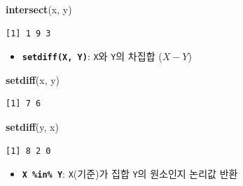 \documentclass[
  11pt,
]{krantz}
\newenvironment{Shaded}{\begin{snugshade}}{\end{snugshade}}
\newcommand{\KeywordTok}[1]{\textcolor[rgb]{0.27,0.27,0.27}{\textbf{#1}}}
\newcommand{\NormalTok}[1]{#1}
\newcommand{\OperatorTok}[1]{\textcolor[rgb]{0.43,0.43,0.43}{\textbf{#1}}}
\newcommand{\StringTok}[1]{\textcolor[rgb]{0.5,0.5,0.5}{#1}}
\providecommand{\tightlist}{%
  \setlength{\itemsep}{0pt}\setlength{\parskip}{0pt}}
\begin{document}
\footnotesize

\begin{Shaded}
\begin{Highlighting}[]
\KeywordTok{intersect}\NormalTok{(x, y)}
\end{Highlighting}
\end{Shaded}

\begin{verbatim}
[1] 1 9 3
\end{verbatim}

\normalsize

\begin{itemize}
\tightlist
\item
  \textbf{\texttt{setdiff(X,\ Y)}}: \texttt{X}와 \texttt{Y}의 차집합 (\(X - Y\))
\end{itemize}

\footnotesize

\begin{Shaded}
\begin{Highlighting}[]
\KeywordTok{setdiff}\NormalTok{(x, y)}
\end{Highlighting}
\end{Shaded}

\begin{verbatim}
[1] 7 6
\end{verbatim}

\begin{Shaded}
\begin{Highlighting}[]
\KeywordTok{setdiff}\NormalTok{(y, x)}
\end{Highlighting}
\end{Shaded}

\begin{verbatim}
[1] 8 2 0
\end{verbatim}

\normalsize

\begin{itemize}
\tightlist
\item
  \textbf{\texttt{X\ \%in\%\ Y}}: \texttt{X}(기준)가 집합 \texttt{Y}의 원소인지 논리값 반환
\end{itemize}

\footnotesize

\begin{Shaded}
\end{Shaded}
\end{document}
